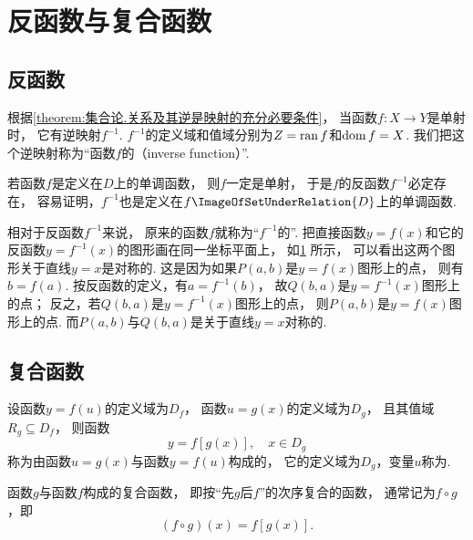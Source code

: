 \section{反函数与复合函数}
\subsection{反函数}
根据\cref{theorem:集合论.关系及其逆是映射的充分必要条件}，
当函数\(f\colon X \to Y\)是单射时，
它有逆映射\(f^{-1}\).
\(f^{-1}\)的定义域和值域分别为\(Z=\operatorname{ran} f\)和\(\operatorname{dom} f=X\).
我们把这个逆映射称为“函数\(f\)的（inverse function）”.

若函数\(f\)是定义在\(D\)上的单调函数，
则\(f\)一定是单射，
于是\(f\)的反函数\(f^{-1}\)必定存在，
容易证明，\(f^{-1}\)也是定义在\(f\ImageOfSetUnderRelation{D}\)上的单调函数.

相对于反函数\(f^{-1}\)来说，
原来的函数\(f\)就称为“\(f^{-1}\)的”.
把直接函数\(y=f(x)\)和它的反函数\(y=f^{-1}(x)\)的图形画在同一坐标平面上，
如\cref{figure:函数.直接函数与反函数的图形的对称性} 所示，
可以看出这两个图形关于直线\(y=x\)是对称的.
这是因为如果\(P(a,b)\)是\(y=f(x)\)图形上的点，
则有\(b=f(a)\).
按反函数的定义，有\(a=f^{-1}(b)\)，
故\(Q(b,a)\)是\(y=f^{-1}(x)\)图形上的点；
反之，若\(Q(b,a)\)是\(y=f^{-1}(x)\)图形上的点，
则\(P(a,b)\)是\(y=f(x)\)图形上的点.
而\(P(a,b)\)与\(Q(b,a)\)是关于直线\(y=x\)对称的.

\begin{figure}[ht]
	\centering
	\caption{}\label{figure:函数.直接函数与反函数的图形的对称性}
\end{figure}

\subsection{复合函数}
\begin{definition}
设函数\(y=f(u)\)的定义域为\(D_f\)，
函数\(u=g(x)\)的定义域为\(D_g\)，
且其值域\(R_g \subseteq D_f\)，
则函数\[
	y = f[g(x)],
	\quad x \in D_g
\]
称为由函数\(u=g(x)\)与函数\(y=f(u)\)构成的，
它的定义域为\(D_g\)，变量\(u\)称为.

函数\(g\)与函数\(f\)构成的复合函数，
即按“先\(g\)后\(f\)”的次序复合的函数，
通常记为\(f \circ g\)，即\[
	(f \circ g)(x) = f[g(x)].
\]
\end{definition}

